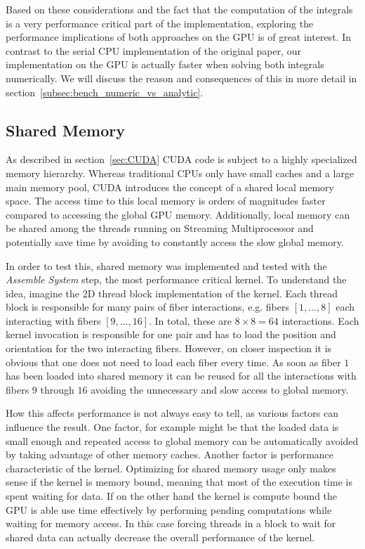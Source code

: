 \documentclass[a4paper,11pt]{kth-mag}
\begin{document}
Based on these considerations and the fact that the computation of the integrals is a very performance critical part of the implementation, exploring the performance implications of both approaches on the GPU is of great interest. In contrast to the serial CPU implementation of the original paper, our implementation on the GPU is actually faster when solving both integrals numerically. We will discuss the reason and consequences of this in more detail in section~\ref{subsec:bench_numeric_vs_analytic}.

\subsection{Shared Memory}
\label{subsec:shared_memory}

As described in section~\ref{sec:CUDA} CUDA code is subject to a highly specialized memory hierarchy. Whereas traditional CPUs only have small caches and a large main memory pool, CUDA introduces the concept of a shared local memory space. The access time to this local memory is orders of magnitudes faster compared to accessing the global GPU memory. Additionally, local memory can be shared among the threads running on Streaming Multiprocessor and potentially save time by avoiding to constantly access the slow global memory.

In order to test this, shared memory was implemented and tested with the \emph{Assemble System} step, the most performance critical kernel. To understand the idea, imagine the 2D thread block implementation of the kernel. Each thread block is responsible for many pairs of fiber interactions, e.g. fibers $[1,\dots,8]$ each interacting with fibers $[9,\dots,16]$. In total, these are $8 \times 8 = 64$ interactions. Each kernel invocation is responsible for one pair and has to load the position and orientation for the two interacting fibers. However, on closer inspection it is obvious that one does not need to load each fiber every time. As soon as fiber $1$ has been loaded into shared memory it can be reused for all the interactions with fibers $9$ through $16$ avoiding the unnecessary and slow access to global memory.

How this affects performance is not always easy to tell, as various factors can influence the result. One factor, for example might be that the loaded data is small enough and repeated access to global memory can be automatically avoided by taking advantage of other memory caches. Another factor is performance characteristic of the kernel. Optimizing for shared memory usage only makes sense if the kernel is memory bound, meaning that most of the execution time is spent waiting for data. If on the other hand the kernel is compute bound the GPU is able use time effectively by performing pending computations while waiting for memory access. In this case forcing threads in a block to wait for shared data can actually decrease the overall performance of the kernel.
\end{document}
